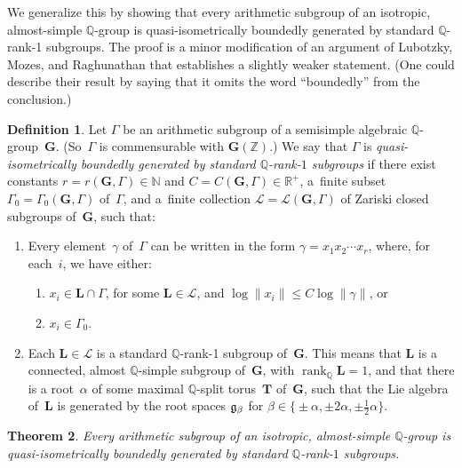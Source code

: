 \documentclass[11pt]{article}
\numberwithin{equation}{section}
\newcommand{\NN}{\mathbb{N}}
\newcommand{\QQ}{\mathbb{Q}}
\newcommand{\RR}{\mathbb{R}}
\newcommand{\ZZ}{\mathbb{Z}}
\newcommand{\Ga}{\mathbf{G}}
\newcommand{\La}{\mathbf{L}}
\newcommand{\Ta}{\mathbf{T}}
\DeclareMathOperator{\rank}{rank}
\newcommand{\Lie}[1]{\lowercase{\mathfrak{#1}}}
\newcommand{\subgroups}{\mathcal{L}}
\numberwithin{equation}{section}
\newtheorem{thm}{Theorem}[section]
\theoremstyle{definition}
\newtheorem{defn}[thm]{Definition}
\begin{document}
We generalize this by showing that every arithmetic subgroup of an isotropic, almost-simple $\QQ$-group is quasi-isometrically boundedly generated by standard $\QQ$-rank-1 subgroups. The proof is a minor modification of an argument of Lubotzky, Mozes, and Raghunathan \cite[Section~4]{MR1828742} that establishes a slightly weaker statement. (One could describe their result by saying that it omits the word ``boundedly'' from the conclusion.)

\begin{defn} \label{QIBddGenDefn}
Let $\Gamma$ be an arithmetic subgroup of a semisimple algebraic $\QQ$-group~$\Ga$. (So~$\Gamma$ is commensurable with $\Ga(\ZZ)$.) We say that $\Gamma$ is \emph{quasi-isometrically boundedly generated by standard $\QQ$-rank-$1$ subgroups} if there exist constants $r = r(\Ga,\Gamma) \in \NN$ and $C = C(\Ga,\Gamma) \in \RR^+$, a~finite subset $\Gamma_0 = \Gamma_0(\Ga,\Gamma)$ of~$\Gamma$, and a~finite collection $\subgroups = \subgroups(\Ga,\Gamma)$ of Zariski closed subgroups of~$\Ga$, such that:
\begin{enumerate}\itemsep=0pt
\item %
	 Every element~$\gamma$ of~$\Gamma$ can be written in the form $\gamma = x_1 x_2 \cdots x_r$, where, for each~$i$, we have either:
\begin{enumerate}\itemsep=0pt
\item %
$x_i \in \La \cap \Gamma$, for some $\La \in \subgroups$, and $\log \|x_i\| \le C \log \|\gamma\|$, or
\item $x_i \in \Gamma_0$.
\end{enumerate}
\item %
Each $\La \in \subgroups$ is a standard $\QQ$-rank-1 subgroup of~$\Ga$. This means that $\La$ is a connected, almost $\QQ$-simple subgroup of~$\Ga$, with $\rank_\QQ \La = 1$, and that there is a root~$\alpha$ of some maximal $\QQ$-split torus~$\Ta$ of~$\Ga$, such that the Lie algebra of~$\La$ is generated by the root spaces $\Lie G_\beta$ for $\beta \in \big\{{\pm} \alpha, \pm 2\alpha, \pm \frac{1}{2} \alpha \big\}$.
\end{enumerate}
\end{defn}

\begin{thm} \label{QIBddGenByRank1}Every arithmetic subgroup of an isotropic, almost-simple $\QQ$-group is quasi-isometrically boundedly generated by standard $\QQ$-rank-$1$ subgroups.
\end{thm}
\end{document}
